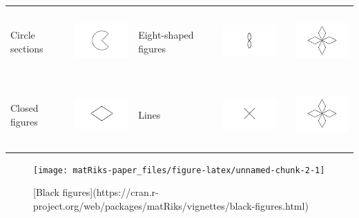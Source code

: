 \begin{table}
\begin{tabular}[t]{l>{}ll>{}ll>{}l}
Circle sections & \includegraphics[width=1in, height=1in]{circle-sections.png} & Eight-shaped figures & \includegraphics[width=1in, height=1in]{eight-shapes-figures.png} &  & \includegraphics[width=1in, height=1in]{other-figures.png}\\
Closed figures & \includegraphics[width=1in, height=1in]{closed-figures.png} & Lines & \includegraphics[width=1in, height=1in]{lines.png} &  & \includegraphics[width=1in, height=1in]{other-figures.png}\\
\bottomrule
\end{tabular}
\end{table}

\begin{figure}
\texttt{[image: matRiks-paper\_files/figure-latex/unnamed-chunk-2-1]} \caption{[Black figures](https://cran.r-project.org/web/packages/matRiks/vignettes/black-figures.html)}\label{fig:unnamed-chunk-2}
\end{figure}

